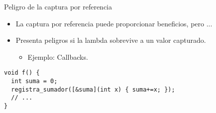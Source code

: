 \begin{frame}[t,fragile]{Peligro de la captura por referencia}
  \begin{itemize}
    \item La captura por referencia puede proporcionar beneficios, pero ...
    \item \pause Presenta peligros si la lambda sobrevive a un valor capturado.
      \begin{itemize}
        \item Ejemplo: Callbacks.
      \end{itemize}
  \end{itemize}
\begin{lstlisting}
void f() {
  int suma = 0;
  registra_sumador([&suma](int x) { suma+=x; });
  // ...
}
\end{lstlisting}
\end{frame}
